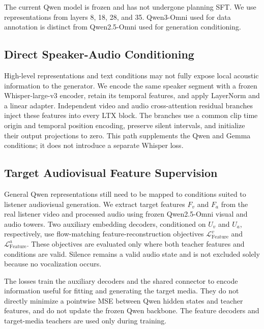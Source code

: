 The current Qwen model is frozen and has not undergone planning SFT. We use representations from layers 8, 18, 28, and 35. Qwen3-Omni used for data annotation is distinct from Qwen2.5-Omni used for generation conditioning.

\subsection{Direct Speaker-Audio Conditioning}
High-level representations and text conditions may not fully expose local acoustic information to the generator. We encode the same speaker segment with a frozen Whisper-large-v3 encoder, retain its temporal features, and apply LayerNorm and a linear adapter. Independent video and audio cross-attention residual branches inject these features into every LTX block. The branches use a common clip time origin and temporal position encoding, preserve silent intervals, and initialize their output projections to zero. This path supplements the Qwen and Gemma conditions; it does not introduce a separate Whisper loss.

\subsection{Target Audiovisual Feature Supervision}
General Qwen representations still need to be mapped to conditions suited to listener audiovisual generation. We extract target features $F_v$ and $F_a$ from the real listener video and processed audio using frozen Qwen2.5-Omni visual and audio towers. Two auxiliary embedding decoders, conditioned on $U_v$ and $U_a$, respectively, use flow-matching feature-reconstruction objectives $\mathcal L_{\mathrm{Feature}}^v$ and $\mathcal L_{\mathrm{Feature}}^a$. These objectives are evaluated only where both teacher features and conditions are valid. Silence remains a valid audio state and is not excluded solely because no vocalization occurs.

The losses train the auxiliary decoders and the shared connector to encode information useful for fitting and generating the target media. They do not directly minimize a pointwise MSE between Qwen hidden states and teacher features, and do not update the frozen Qwen backbone. The feature decoders and target-media teachers are used only during training.

